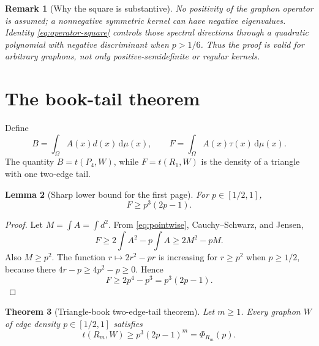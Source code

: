 \documentclass[11pt]{article}
\newtheorem{theorem}{Theorem}[section]
\newtheorem{lemma}[theorem]{Lemma}
\newtheorem{remark}[theorem]{Remark}
\newcommand{\dd}{\,\mathrm d}
\begin{document}
\begin{remark}[Why the square is substantive]
No positivity of the graphon operator is assumed; a nonnegative symmetric
kernel can have negative eigenvalues.  Identity
\eqref{eq:operator-square} controls those spectral directions through a
quadratic polynomial with negative discriminant when $p>1/6$.  Thus the
proof is valid for arbitrary graphons, not only positive-semidefinite or
regular kernels.
\end{remark}


\section{The book-tail theorem}

Define
\[
 B=\int_\Omega A(x)d(x)\dd\mu(x),
 \qquad
 F=\int_\Omega A(x)\tau(x)\dd\mu(x).
\]
The quantity $B=t(P_4,W)$, while $F=t(R_1,W)$ is the density of a
triangle with one two-edge tail.

\begin{lemma}[Sharp lower bound for the first page]
\label{lem:first-page}
For $p\in[1/2,1]$,
\[
 F\geq p^3(2p-1).
\]
\end{lemma}

\begin{proof}
Let $M=\int A=\int d^2$.  From \eqref{eq:pointwise}, Cauchy--Schwarz,
and Jensen,
\[
 F\geq2\int A^2-p\int A\geq2M^2-pM.
\]
Also $M\geq p^2$.  The function $r\mapsto2r^2-pr$ is increasing for
$r\geq p^2$ when $p\geq1/2$, because there
$4r-p\geq4p^2-p\geq0$.  Hence
\[
 F\geq2p^4-p^3=p^3(2p-1).
\]
\end{proof}

\begin{theorem}[Triangle-book two-edge-tail theorem]
\label{thm:main}
Let $m\geq1$.  Every graphon $W$ of edge density
$p\in[1/2,1]$ satisfies
\[
 \boxed{
 t(R_m,W)\geq p^3(2p-1)^m=\Phi_{R_m}(p).
 }
\]
\end{theorem}
\end{document}
